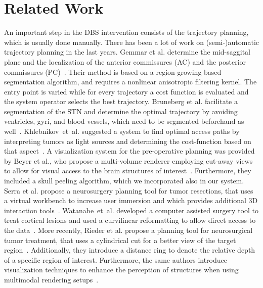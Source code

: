 \documentclass[review]{vgtc}                 %
\begin{document}
\section{Related Work}\label{sec:related}
An important step in the DBS intervention consists of the trajectory planning, which is usually done manually. There has been a lot of work on (semi-)automatic trajectory planning in the last years. Gemmar et al. determine the mid-saggital plane and the localization of the anterior commissures (AC) and the posterior commissures (PC)~\cite{Gemmar2008}. Their method is based on a region-growing based segmentation algorithm, and requires a nonlinear anisotropic filtering kernel. The entry point is varied while for every trajectory a cost function is evaluated and the system operator selects the best trajectory. Bruneberg et al. facilitate a segmentation of the STN and determine the optimal trajectory by avoiding ventricles, gyri, and blood vessels, which need to be segmented beforehand as well~\cite{Brunenberg2007}. Khlebnikov~et~al. suggested a system to find optimal access paths by interpreting tumors as light sources and determining the cost-function based on that aspect~\cite{Khlebnikov2011}. A visualization system for the pre-operative planning was provided by Beyer et al., who propose a multi-volume renderer employing cut-away views to allow for visual access to the brain structures of interest~\cite{Beyer2007}. Furthermore, they included a skull peeling algorithm, which we incorporated also in our system. Serra et al. propose a neurosurgery planning tool for tumor resections, that uses a virtual workbench to increase user immersion and which provides additional 3D interaction tools~\cite{Serra1998}. Watanabe~et~al. developed a computer assisted surgery tool to treat cortical lesions and used a curvilinear reformatting to allow direct access to the data~\cite{Watanabe}.  More recently, Rieder et al. propose a planning tool for neurosurgical tumor treatment, that uses a cylindrical cut for a better view of the target region~\cite{Rieder2008}. Additionally, they introduce a distance ring to denote the relative depth of a specific region of interest. Furthermore, the same authors introduce visualization techniques to enhance the perception of structures when using multimodal rendering setups~\cite{Rieder2008a}.
\end{document}

